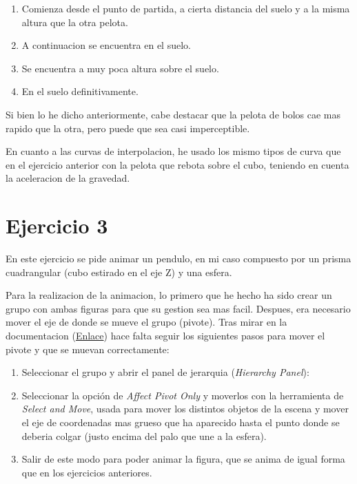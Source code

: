 \documentclass{article}
\begin{document}
\begin{enumerate}
    \item Comienza desde el punto de partida, a cierta distancia del suelo y a la misma altura que la otra pelota.
    \item A continuacion se encuentra en el suelo.
    \item Se encuentra a muy poca altura sobre el suelo.
    \item En el suelo definitivamente.
\end{enumerate}


Si bien lo he dicho anteriormente, cabe destacar que la pelota de bolos cae mas rapido que la otra, pero puede que sea casi imperceptible.

En cuanto a las curvas de interpolacion, he usado los mismo tipos de curva que en el ejercicio anterior con la pelota que rebota sobre el cubo, teniendo en cuenta la aceleracion de la gravedad. 



\section{Ejercicio 3}

En este ejercicio se pide animar un pendulo, en mi caso compuesto por un prisma cuadrangular (cubo estirado en el eje Z) y una esfera.


Para la realizacion de la animacion, lo primero que he hecho ha sido crear un grupo con ambas figuras para que su gestion sea mas facil. Despues, era necesario mover el eje de donde se mueve el grupo (pivote). Tras mirar en la documentacion (\href{https://knowledge.autodesk.com/support/3ds-max/learn-explore/caas/CloudHelp/cloudhelp/2021/ENU/3DSMax-Animation/files/GUID-6872F014-4785-43D9-A83B-C774507907B3-htm.html}{Enlace}) hace falta seguir los siguientes pasos para mover el pivote y que se muevan correctamente:

\begin{enumerate}
    \item Seleccionar el grupo y abrir el panel de jerarquia (\textit{Hierarchy Panel}):
    

    \item Seleccionar la opción de \textit{Affect Pivot Only} y moverlos con la herramienta de \textit{Select and Move}, usada para mover los distintos objetos de la escena y mover el eje de coordenadas mas grueso que ha aparecido hasta el punto donde se deberia colgar (justo encima del palo que une a la esfera).
    

    \item Salir de este modo para poder animar la figura, que se anima de igual forma que en los ejercicios anteriores.
\end{enumerate}
\end{document}
